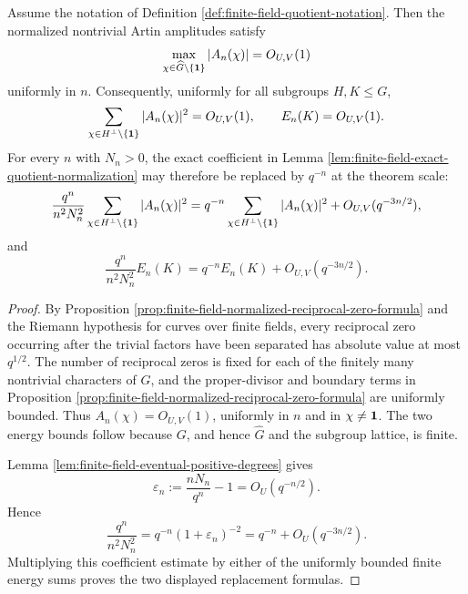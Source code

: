 \begin{lemma}\label{lem:finite-field-uniform-energy-normalization}
Assume the notation of Definition \ref{def:finite-field-quotient-notation}. Then the normalized nontrivial Artin amplitudes satisfy
\[
\max_{\chi\in\widehat G\setminus\{\mathbf{1}\}} |A_n(\chi)|=O_{U,V}(1)
\]
uniformly in \(n\). Consequently, uniformly for all subgroups \(H,K\le G\),
\[
\sum_{\chi\in H^\perp\setminus\{\mathbf{1}\}}|A_n(\chi)|^2=O_{U,V}(1),
\qquad
E_n(K)=O_{U,V}(1).
\]
For every \(n\) with \(N_n>0\), the exact coefficient in Lemma \ref{lem:finite-field-exact-quotient-normalization} may therefore be replaced by \(q^{-n}\) at the theorem scale:
\[
\frac{q^n}{n^2N_n^2}
\sum_{\chi\in H^\perp\setminus\{\mathbf{1}\}}|A_n(\chi)|^2
=
q^{-n}
\sum_{\chi\in H^\perp\setminus\{\mathbf{1}\}}|A_n(\chi)|^2
+O_{U,V}(q^{-3n/2}),
\]
and
\[
\frac{q^n}{n^2N_n^2}E_n(K)
=
q^{-n}E_n(K)+O_{U,V}(q^{-3n/2}).
\]
\end{lemma}

\begin{proof}
By Proposition \ref{prop:finite-field-normalized-reciprocal-zero-formula} and the Riemann hypothesis for curves over finite fields, every reciprocal zero occurring after the trivial factors have been separated has absolute value at most \(q^{1/2}\). The number of reciprocal zeros is fixed for each of the finitely many nontrivial characters of \(G\), and the proper-divisor and boundary terms in Proposition \ref{prop:finite-field-normalized-reciprocal-zero-formula} are uniformly bounded. Thus \(A_n(\chi)=O_{U,V}(1)\), uniformly in \(n\) and in \(\chi\ne\mathbf{1}\). The two energy bounds follow because \(G\), and hence \(\widehat G\) and the subgroup lattice, is finite.

Lemma \ref{lem:finite-field-eventual-positive-degrees} gives
\[
\varepsilon_n:=\frac{nN_n}{q^n}-1=O_U(q^{-n/2}).
\]
Hence
\[
\frac{q^n}{n^2N_n^2}=q^{-n}(1+\varepsilon_n)^{-2}=q^{-n}+O_U(q^{-3n/2}).
\]
Multiplying this coefficient estimate by either of the uniformly bounded finite energy sums proves the two displayed replacement formulas.
\end{proof}

